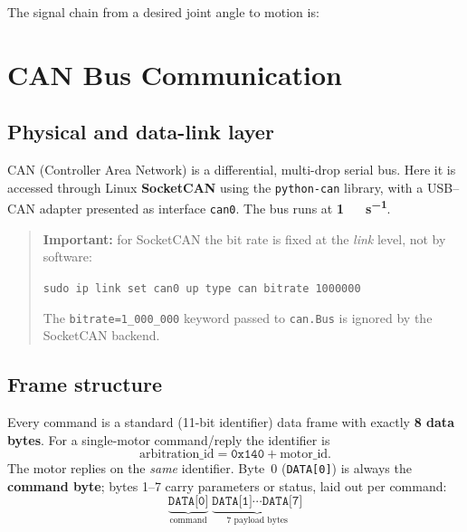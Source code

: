 \documentclass[11pt,a4paper]{article}
\newcommand{\code}[1]{\texttt{#1}}
\begin{document}
The signal chain from a desired joint angle to motion is:
\begin{center}
\end{center}

\section{CAN Bus Communication}

\subsection{Physical and data-link layer}
CAN (Controller Area Network) is a differential, multi-drop serial bus. Here it
is accessed through Linux \textbf{SocketCAN} using the \code{python-can} library,
with a USB--CAN adapter presented as interface \code{can0}. The bus runs at
\textbf{\SI{1}{\mega\bit\per\second}}.

\begin{quote}\small
\textbf{Important:} for SocketCAN the bit rate is fixed at the \emph{link}
level, not by software:
\begin{center}\code{sudo ip link set can0 up type can bitrate 1000000}\end{center}
The \code{bitrate=1\_000\_000} keyword passed to \code{can.Bus} is ignored by
the SocketCAN backend.
\end{quote}

\subsection{Frame structure}
Every command is a standard (11-bit identifier) data frame with exactly
\textbf{8 data bytes}. For a single-motor command/reply the identifier is
\begin{equation}
  \text{arbitration\_id} = \mathtt{0x140} + \text{motor\_id}.
\end{equation}
The motor replies on the \emph{same} identifier. Byte~0 (\code{DATA[0]}) is
always the \textbf{command byte}; bytes 1--7 carry parameters or status,
laid out per command:
\[
\underbrace{\texttt{DATA[0]}}_{\text{command}}\;
\underbrace{\texttt{DATA[1]}\cdots\texttt{DATA[7]}}_{\text{7 payload bytes}}
\]
\end{document}
